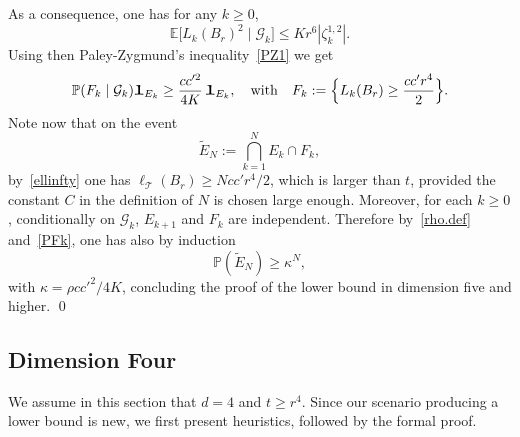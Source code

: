 \documentclass[JEP,XML,SOM,Unicode,NoFloatCountersInSection,published]{cedram}
\theoremstyle{plain}
\theoremstyle{definition}
\newcommand{\1}{{\text{\Large $\mathfrak 1$}}}
\begin{document}
As a consequence, one has for any $k\ge 0$,
\[
\mathbb E\big[L_k(B_r)^2\mid \mathcal G_k\big] \le Kr^6 |\zeta_k^{1,2}|.
\]
Using then Paley-Zygmund's inequality~\eqref{PZ1} we get
\begin{equation}\label{PFk}
\mathbb P(F_k \mid \mathcal G_k)\1_{E_k} \ge \frac{cc'^2}{4K}\,\1_{E_k}, \quad \text{with}\quad F_k:= \Big\{L_k(B_r)\ge \frac{cc'r^4}{2}\Big\}.
\end{equation}
Note now that on the event
\[
\tilde E_N := \bigcap_{k=1}^N E_k \cap F_k,
\]
by~\eqref{ellinfty} one has $\ell_{\mathcal T}(B_r) \ge N cc'r^4/2$, which is larger than $t$, provided the constant $C$ in the definition of $N$ is chosen
large enough. Moreover, for each $k\ge 0$, conditionally on $\mathcal G_k$, $E_{k+1}$ and $F_k$ are independent. Therefore by~\eqref{rho.def} and~\eqref{PFk}, one has also by induction
\[
\mathbb P(\tilde E_N) \ge \kappa^N,
\]
with $\kappa=\rho cc'^2/4K$, concluding the proof of the lower bound in dimension five and higher. \qed

\subsection{Dimension Four}
We assume in this section that $d=4$ and $t\ge r^4$.
Since our scenario producing a lower bound is new, we first present
heuristics, followed by the formal proof.
\end{document}
